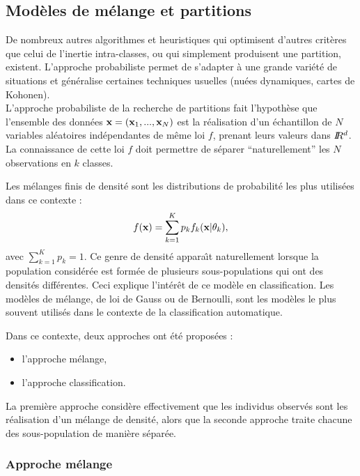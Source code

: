 

\subsection{Mod\`eles de m\'elange et partitions}
De nombreux autres algorithmes et heuristiques qui optimisent d'autres
crit\`eres que celui de l'inertie intra-classes,  ou qui simplement 
produisent une partition, existent. L'approche probabiliste permet
de s'adapter \`a une grande vari\'et\'e de situations et
g\'en\'eralise certaines techniques usuelles 
(nu\'ees dynamiques, cartes de Kohonen). \\ 

L'approche probabiliste de la recherche de partitions fait
l'hypoth\`ese que l'ensemble des donn\'ees $\mbox{\bf x}=(\mbox{\bf x}_1,...,\mbox{\bf x}_N)$ est la
r\'ealisation d'un \'echantillon de $N$ variables al\'eatoires ind\'ependantes
de m\^eme loi $f$, prenant leurs valeurs dans $I\!\!R^d$. La connaissance 
de cette loi $f$ doit permettre de s\'eparer ``naturellement'' les $N$
observations en $k$ classes.  

Les m\'elanges finis de densit\'e sont les distributions de probabilit\'e
les plus  utilis\'ees dans ce contexte :
\begin{equation}
f(\mbox{\bf x})=\sum_{k=1}^K p_k f_k(\mbox{\bf x} | \theta_k),
\end{equation}
avec $\sum_{k=1}^K p_k=1$. Ce genre de densit\'e appara\^{\i}t naturellement
lorsque la population consid\'er\'ee est form\'ee de plusieurs
sous-populations qui ont des densit\'es diff\'erentes. 
Ceci explique l'int\'er\^et de ce mod\`ele en classification. 
Les mod\`eles de m\'elange,  de loi de Gauss ou de Bernoulli, sont
les mod\`eles le plus souvent utilis\'es  dans le contexte de la
classification automatique.

Dans ce contexte, deux approches ont \'et\'e propos\'ees :
\begin{itemize}
\item
l'approche m\'elange,
\item
l'approche classification.
\end{itemize} 
La premi\`ere approche consid\`ere effectivement que les individus
observ\'es sont les r\'ealisation d'un m\'elange de densit\'e, 
alors que la seconde approche traite chacune des sous-population
de mani\`ere s\'epar\'ee. 

\subsubsection{Approche  m\'elange}

